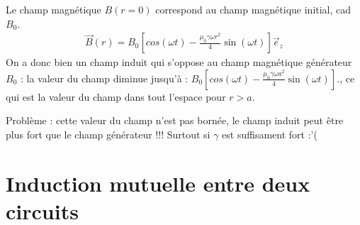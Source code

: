 \documentclass{report}
\begin{document}
\begin{itemize}
Le champ magnétique $B(r=0)$ correspond au champ magnétique initial, cad $B_0$. 
\begin{align*}
	\vec{B}(r) = B_0\left[cos(\omega t)  - \frac{\mu_0\gamma \omega r^2}{4}\sin(\omega t)\right] \vec{e}_z
\end{align*}
On a donc bien un champ induit qui s'oppose au champ magnétique générateur $B_0$ : la valeur du champ diminue jusqu'à : $B_0\left[cos(\omega t)  - \frac{\mu_0\gamma \omega a^2}{4}\sin(\omega t)\right]$., ce qui est la valeur du champ dans tout l'espace pour $r>a$.

Problème : cette valeur du champ n'est pas bornée, le champ induit peut être plus fort que le champ générateur !!! Surtout si $\gamma$ est suffisament fort :'(

\end{itemize}

\section*{Induction mutuelle entre deux circuits}
\end{document}
